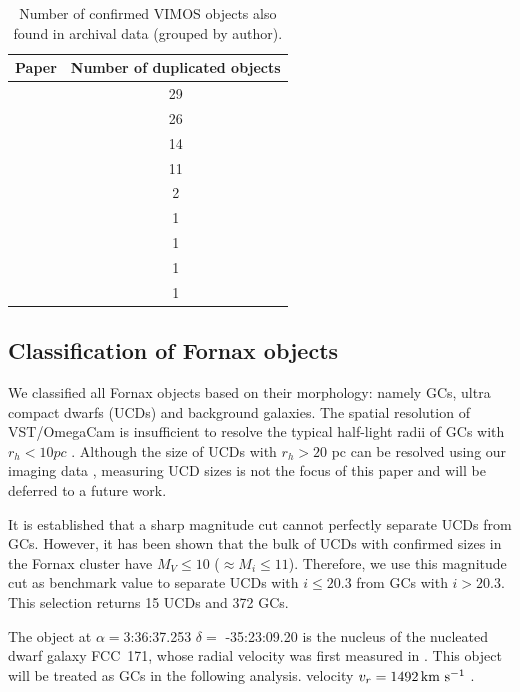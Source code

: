 \begin{table}
\centering
\label{mathmode}
\begin{tabular}{@{}l c}
\hline
Paper & Number of duplicated objects \\
\hline
\citet{Dirsch04} &         29 \\
\citet{Schuberth10} &       26 \\
\citet{Bergond07}  &     14 \\
\citet{Firth07}   &      11 \\
\citet{Chilingarian11} &     2 \\
\citet{Mieske04} &       1 \\
\citet{Hilker07}  &     1 \\
\citet{Francis12}   &     1 \\
\citet{Drinkwater00}  &    1 \\
\hline
\end{tabular}
\caption{Number of confirmed VIMOS objects also found in archival data (grouped 
by author). }
\label{tab:authors} 
\end{table}

\subsection{Classification of Fornax objects}

We classified all Fornax objects based on their morphology: namely GCs, ultra 
compact dwarfs (UCDs) and background galaxies. The spatial resolution of 
VST/OmegaCam is insufficient to resolve the typical half-light radii of GCs 
with $r_h < 10 pc$ \citep{Masters, Puzia11}. Although the size of UCDs with 
$r_h > 20$ pc can be resolved using our imaging data \citep{Cantiello15}, 
measuring UCD sizes is not the focus of this paper and will be deferred to a 
future work.

It is established that a sharp magnitude cut cannot perfectly separate UCDs 
from GCs. However, it has been shown \citep{Voggel16, Eigenthaler18} that the 
bulk of UCDs with confirmed sizes in the Fornax cluster have $M_V \le 10$ 
($\approx M_i \le 11$). Therefore, we use this magnitude cut as benchmark value 
to separate UCDs with $i \le 20.3$ from GCs with $i > 20.3$. This selection 
returns 15 UCDs and 372 GCs. 

The object at $\alpha=$3:36:37.253 $\delta=$ -35:23:09.20 is the nucleus of the 
nucleated dwarf galaxy FCC~171, whose radial velocity was first measured in 
\citet{Bergond07}. This object will be treated as GCs in the following 
analysis.  
velocity $v_r = 1492 \mbox{\,km~s$^{-1}$}$ \citet{Chilingarian11}. 

